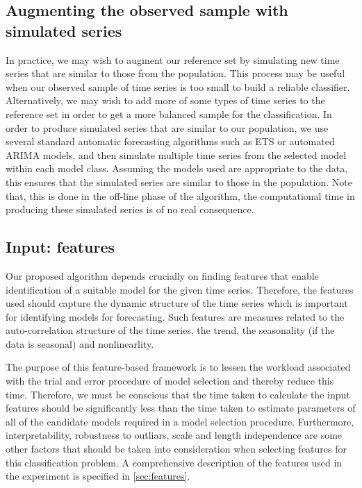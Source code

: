 \documentclass[11pt,]{article}
\theoremstyle{definition}
\theoremstyle{definition}
\theoremstyle{definition}
\theoremstyle{remark}
\begin{document}
\subsection{Augmenting the observed sample with simulated
series}\label{augmenting-the-observed-sample-with-simulated-series}

In practice, we may wish to augment our reference set by simulating new
time series that are similar to those from the population. This process
may be useful when our observed sample of time series is too small to
build a reliable classifier. Alternatively, we may wish to add more of
some types of time series to the reference set in order to get a more
balanced sample for the classification. In order to produce simulated
series that are similar to our population, we use several standard
automatic forecasting algorithms such as ETS or automated ARIMA models,
and then simulate multiple time series from the selected model within
each model class. Assuming the models used are appropriate to the data,
this ensures that the simulated series are similar to those in the
population. Note that, this is done in the off-line phase of the
algorithm, the computational time in producing these simulated series is
of no real consequence.

\subsection{Input: features}\label{input-features}

Our proposed algorithm depends crucially on finding features that enable
identification of a suitable model for the given time series. Therefore,
the features used should capture the dynamic structure of the time
series which is important for identifying models for forecasting. Such
features are measures related to the auto-correlation structure of the
time series, the trend, the seasonality (if the data is seasonal) and
nonlinearlity.

The purpose of this feature-based framework is to lessen the workload
associated with the trial and error procedure of model selection and
thereby reduce this time. Therefore, we must be conscious that the time
taken to calculate the input features should be significantly less than
the time taken to estimate parameters of all of the candidate models
required in a model selection procedure. Furthermore, interpretability,
robustness to outliars, scale and length independence are some other
factors that should be taken into consideration when selecting features
for this classification problem. A comprehensive description of the
features used in the experiment is specified in \autoref{sec:features}.
\end{document}
